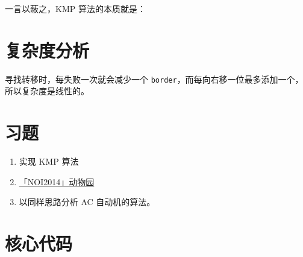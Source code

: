 \documentclass{article}
\begin{document}
一言以蔽之，KMP 算法的本质就是：
\begin{center}
\end{center}


\section{复杂度分析}

寻找转移时，每失败一次就会减少一个 \texttt{border}，而每向右移一位最多添加一个，所以复杂度是线性的。



\section{习题}
\begin{enumerate}
\item 实现 KMP 算法
\item \href{https://loj.ac/problem/2246}{「NOI2014」动物园}
\item 以同样思路分析 AC 自动机的算法。

\end{enumerate}

\newpage
\section{核心代码}
\inputminted[linenos,autogobble]{cpp}{kmp.cpp}
\end{document}
